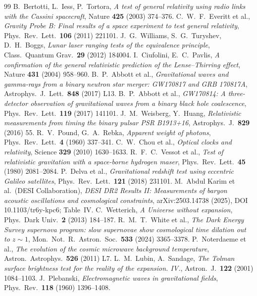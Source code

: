 \begin{thebibliography}{99}
 B.~Bertotti, L.~Iess, P.~Tortora, \textit{A test of general relativity using radio links with the Cassini spacecraft}, Nature \textbf{425} (2003) 374--376.
 C.~W.~F.~Everitt et al., \textit{Gravity Probe B: Final results of a space experiment to test general relativity}, Phys.\ Rev.\ Lett.\ \textbf{106} (2011) 221101.
 J.~G.~Williams, S.~G.~Turyshev, D.~H.~Boggs, \textit{Lunar laser ranging tests of the equivalence principle}, Class.\ Quantum Grav.\ \textbf{29} (2012) 184004.
 I.~Ciufolini, E.~C.~Pavlis, \textit{A confirmation of the general relativistic prediction of the Lense--Thirring effect}, Nature \textbf{431} (2004) 958--960.
 B.~P.~Abbott et al., \textit{Gravitational waves and gamma-rays from a binary neutron star merger: GW170817 and GRB 170817A}, Astrophys.\ J.\ Lett.\ \textbf{848} (2017) L13.
 B.~P.~Abbott et al., \textit{GW170814: A three-detector observation of gravitational waves from a binary black hole coalescence}, Phys.\ Rev.\ Lett.\ \textbf{119} (2017) 141101.
 J.~M.~Weisberg, Y.~Huang, \textit{Relativistic measurements from timing the binary pulsar PSR B1913+16}, Astrophys.\ J.\ \textbf{829} (2016) 55.
 R.~V.~Pound, G.~A.~Rebka, \textit{Apparent weight of photons}, Phys.\ Rev.\ Lett.\ \textbf{4} (1960) 337--341.
 C.~W.~Chou et al., \textit{Optical clocks and relativity}, Science \textbf{329} (2010) 1630--1633.
 R.~F.~C.~Vessot et al., \textit{Test of relativistic gravitation with a space-borne hydrogen maser}, Phys.\ Rev.\ Lett.\ \textbf{45} (1980) 2081--2084.
 P.~Delva et al., \textit{Gravitational redshift test using eccentric Galileo satellites}, Phys.\ Rev.\ Lett.\ \textbf{121} (2018) 231101.
 M.~Abdul Karim et al.\ (DESI Collaboration), \textit{DESI DR2 Results II: Measurements of baryon acoustic oscillations and cosmological constraints}, arXiv:2503.14738 (2025), DOI 10.1103/tr6y-kpc6; Table~IV.
 C.~Wetterich, \textit{A Universe without expansion}, Phys.\ Dark Univ.\ \textbf{2} (2013) 184--187.
 R.~M.~T.~White et al., \textit{The Dark Energy Survey supernova program: slow supernovae show cosmological time dilation out to $z\sim1$}, Mon.\ Not.\ R.\ Astron.\ Soc.\ \textbf{533} (2024) 3365--3378.
 P.~Noterdaeme et al., \textit{The evolution of the cosmic microwave background temperature}, Astron.\ Astrophys.\ \textbf{526} (2011) L7.
 L.~M.~Lubin, A.~Sandage, \textit{The Tolman surface brightness test for the reality of the expansion. IV.}, Astron.\ J.\ \textbf{122} (2001) 1084--1103.
 J.~Plebanski, \textit{Electromagnetic waves in gravitational fields}, Phys.\ Rev.\ \textbf{118} (1960) 1396--1408.
\end{thebibliography}
